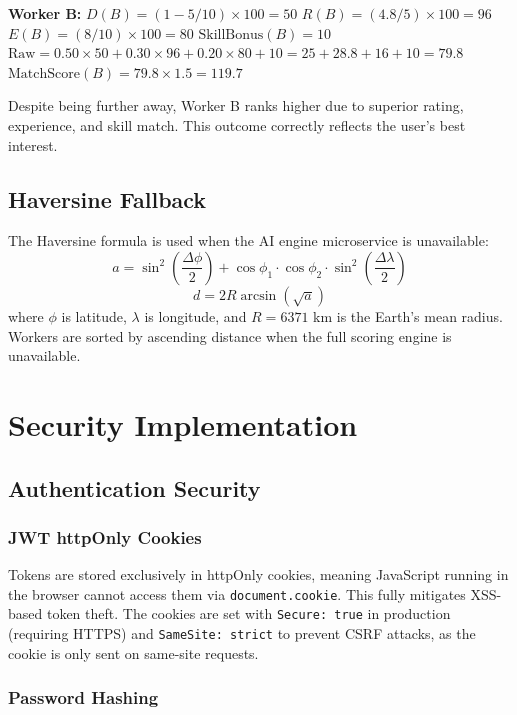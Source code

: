 \documentclass[12pt,a4paper]{report}
\begin{document}
\textbf{Worker B:}
$D(B) = (1 - 5/10) \times 100 = 50$
$R(B) = (4.8/5) \times 100 = 96$
$E(B) = (8/10) \times 100 = 80$
$\text{SkillBonus}(B) = 10$
$\text{Raw} = 0.50 \times 50 + 0.30 \times 96 + 0.20 \times 80 + 10 = 25 + 28.8 + 16 + 10 = 79.8$
$\text{MatchScore}(B) = 79.8 \times 1.5 = \mathbf{119.7}$

Despite being further away, Worker B ranks higher due to superior rating, experience, and skill match. This outcome correctly reflects the user's best interest.

\section{Haversine Fallback}

The Haversine formula is used when the AI engine microservice is unavailable:
$$a = \sin^2\!\left(\frac{\Delta\phi}{2}\right) + \cos\phi_1 \cdot \cos\phi_2 \cdot \sin^2\!\left(\frac{\Delta\lambda}{2}\right)$$
$$d = 2R \arcsin\!\left(\sqrt{a}\right)$$
where $\phi$ is latitude, $\lambda$ is longitude, and $R = 6371$ km is the Earth's mean radius. Workers are sorted by ascending distance when the full scoring engine is unavailable.

\chapter{Security Implementation}

\section{Authentication Security}

\subsection{JWT httpOnly Cookies}

Tokens are stored exclusively in httpOnly cookies, meaning JavaScript running in the browser cannot access them via \texttt{document.cookie}. This fully mitigates XSS-based token theft. The cookies are set with \texttt{Secure: true} in production (requiring HTTPS) and \texttt{SameSite: strict} to prevent CSRF attacks, as the cookie is only sent on same-site requests.

\subsection{Password Hashing}
\end{document}
